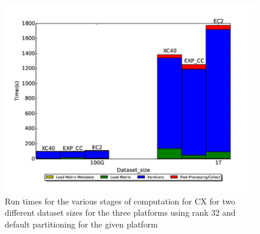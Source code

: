     \begin{figure} [H]
    \begin{centering}
    \includegraphics[scale=0.4]{images/CX_Size_Scaling_Rank_32_Partitions_default.pdf}
    \end{centering}
    \caption{ Run times for the various stages of computation for CX for two different dataset sizes for the three platforms using rank 32 and default partitioning for the given platform}
    \label{fig:h2hrank32} 
    \end{figure}
    

